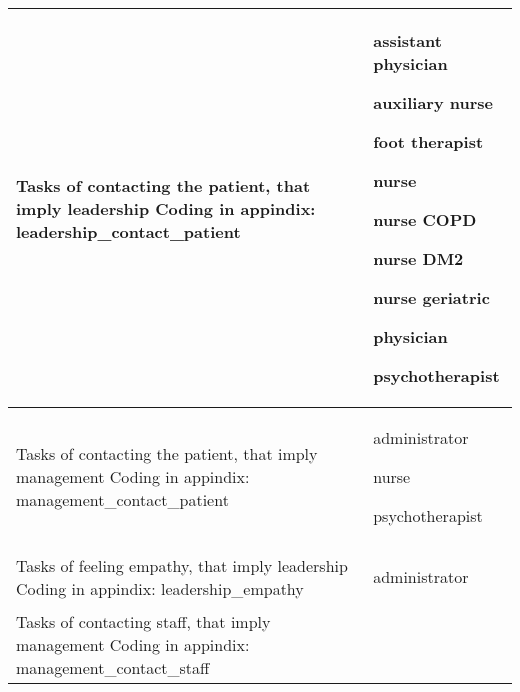\documentclass[12pt,a4paper,oneside]{article}
\begin{document}
\nopagebreak
\begin{table}
\begin{tabularx}{\textwidth}{|X|X|}
\hline
Tasks of contacting the patient, that imply leadership
{\newline\tiny Coding in appindix: {leadership\_contact\_patient}}&{\begin{itemize}
\vspace{-1.5em}\setlength\itemsep{0em}
{ \item assistant physician}
{ \item auxiliary nurse}
{ \item foot therapist}
{ \item nurse}
{ \item nurse COPD}
{ \item nurse DM2}
{ \item nurse geriatric}
{ \item physician}
{ \item psychotherapist}\vspace{-.5em}\vspace{-.5em}\end{itemize}}\\
\hline
Tasks of contacting the patient, that imply management
{\newline\tiny Coding in appindix: {management\_contact\_patient}}&{\begin{itemize}
\vspace{-1.5em}\setlength\itemsep{0em}
{ \item administrator}
{ \item nurse}
{ \item psychotherapist}
\vspace{-.5em}\end{itemize}}\\
\hline
Tasks of feeling empathy, that imply leadership
{\newline\tiny Coding in appindix: {leadership\_empathy}}&{\begin{itemize}
\vspace{-1.5em}\setlength\itemsep{0em}
{ \item administrator}
\vspace{-.5em}\end{itemize}}\\
\hline
Tasks of contacting staff, that imply management
{\newline\tiny Coding in appindix: {management\_contact\_staff}}&{\begin{itemize}
\vspace{-1.5em}\setlength\itemsep{0em}

\end{itemize}}
\end{tabularx}
\end{table}
\end{document}
